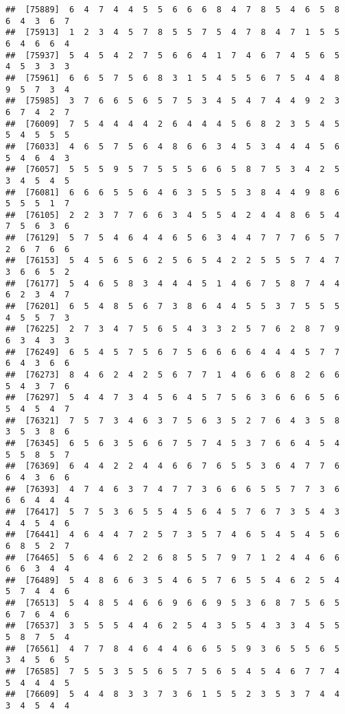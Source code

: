 \documentclass[
]{book}
\begin{document}
\begin{verbatim}
##  [75889]  6  4  7  4  4  5  5  6  6  6  8  4  7  8  5  4  6  5  8  6  4  3  6  7
##  [75913]  1  2  3  4  5  7  8  5  5  7  5  4  7  8  4  7  1  5  5  6  4  6  6  4
##  [75937]  5  4  5  4  2  7  5  6  6  4  1  7  4  6  7  4  5  6  5  4  5  3  3  3
##  [75961]  6  6  5  7  5  6  8  3  1  5  4  5  5  6  7  5  4  4  8  9  5  7  3  4
##  [75985]  3  7  6  6  5  6  5  7  5  3  4  5  4  7  4  4  9  2  3  6  7  4  2  7
##  [76009]  7  5  4  4  4  4  2  6  4  4  4  5  6  8  2  3  5  4  5  5  4  5  5  5
##  [76033]  4  6  5  7  5  6  4  8  6  6  3  4  5  3  4  4  4  5  6  5  4  6  4  3
##  [76057]  5  5  5  9  5  7  5  5  5  6  6  5  8  7  5  3  4  2  5  3  4  5  4  5
##  [76081]  6  6  6  5  5  6  4  6  3  5  5  5  3  8  4  4  9  8  6  5  5  5  1  7
##  [76105]  2  2  3  7  7  6  6  3  4  5  5  4  2  4  4  8  6  5  4  7  5  6  3  6
##  [76129]  5  7  5  4  6  4  4  6  5  6  3  4  4  7  7  7  6  5  7  2  6  7  6  6
##  [76153]  5  4  5  6  5  6  2  5  6  5  4  2  2  5  5  5  7  4  7  3  6  6  5  2
##  [76177]  5  4  6  5  8  3  4  4  4  5  1  4  6  7  5  8  7  4  4  6  2  3  4  7
##  [76201]  6  5  4  8  5  6  7  3  8  6  4  4  5  5  3  7  5  5  5  4  5  5  7  3
##  [76225]  2  7  3  4  7  5  6  5  4  3  3  2  5  7  6  2  8  7  9  6  3  4  3  3
##  [76249]  6  5  4  5  7  5  6  7  5  6  6  6  6  4  4  4  5  7  7  6  4  3  6  6
##  [76273]  8  4  6  2  4  2  5  6  7  7  1  4  6  6  6  8  2  6  6  5  4  3  7  6
##  [76297]  5  4  4  7  3  4  5  6  4  5  7  5  6  3  6  6  6  5  6  5  4  5  4  7
##  [76321]  7  5  7  3  4  6  3  7  5  6  3  5  2  7  6  4  3  5  8  3  5  3  8  6
##  [76345]  6  5  6  3  5  6  6  7  5  7  4  5  3  7  6  6  4  5  4  5  5  8  5  7
##  [76369]  6  4  4  2  2  4  4  6  6  7  6  5  5  3  6  4  7  7  6  6  4  3  6  6
##  [76393]  4  7  4  6  3  7  4  7  7  3  6  6  6  5  5  7  7  3  6  6  6  4  4  4
##  [76417]  5  7  5  3  6  5  5  4  5  6  4  5  7  6  7  3  5  4  3  4  4  5  4  6
##  [76441]  4  6  4  4  7  2  5  7  3  5  7  4  6  5  4  5  4  5  6  6  8  5  2  7
##  [76465]  5  6  4  6  2  2  6  8  5  5  7  9  7  1  2  4  4  6  6  6  6  3  4  4
##  [76489]  5  4  8  6  6  3  5  4  6  5  7  6  5  5  4  6  2  5  4  5  7  4  4  6
##  [76513]  5  4  8  5  4  6  6  9  6  6  9  5  3  6  8  7  5  6  5  6  7  6  4  6
##  [76537]  3  5  5  5  4  4  6  2  5  4  3  5  5  4  3  3  4  5  5  5  8  7  5  4
##  [76561]  4  7  7  8  4  6  4  4  6  6  5  5  9  3  6  5  5  6  5  3  4  5  6  5
##  [76585]  7  5  5  3  5  5  6  5  7  5  6  5  4  5  4  6  7  7  4  5  4  4  4  5
##  [76609]  5  4  4  8  3  3  7  3  6  1  5  5  2  3  5  3  7  4  4  3  4  5  4  4

\end{verbatim}
\end{document}
